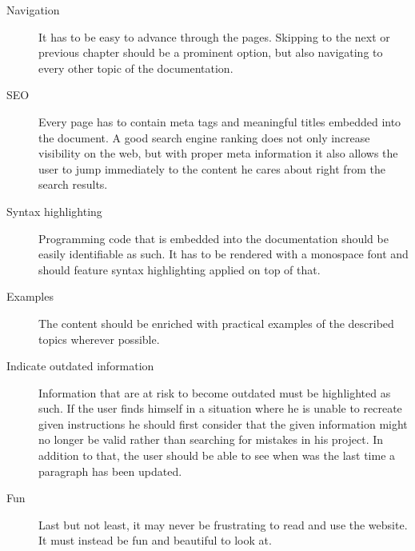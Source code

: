 \begin{description}
	\item[Navigation]\hfill

	It has to be easy to advance through the pages. Skipping to the next or previous chapter should be a prominent option, but also navigating to every other topic of the documentation.

	\item[SEO]\hfill

	Every page has to contain meta tags and meaningful titles embedded into the document. A good search engine ranking does not only increase visibility on the web, but with proper meta information it also allows the user to jump immediately to the content he cares about right from the search results.

	\item[Syntax highlighting]\hfill

	Programming code that is embedded into the documentation should be easily identifiable as such. It has to be rendered with a monospace font and should feature syntax highlighting applied on top of that.

	\item[Examples]\hfill

	The content should be enriched with practical examples of the described topics wherever possible.

	\item[Indicate outdated information]\hfill

	Information that are at risk to become outdated must be highlighted as such. If the user finds himself in a situation where he is unable to recreate given instructions he should first consider that the given information might no longer be valid rather than searching for mistakes in his project. In addition to that, the user should be able to see when was the last time a paragraph has been updated.

	\item[Fun]\hfill

	Last but not least, it may never be frustrating to read and use the website. It must instead be fun and beautiful to look at.

\end{description}